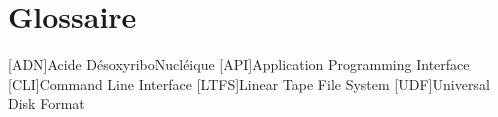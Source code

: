 
\chapter*{Glossaire}
\begin{acronym}
	[ADN]{Acide DésoxyriboNucléique}
	[API]{Application Programming Interface}
	[CLI]{Command Line Interface}
	[LTFS]{Linear Tape File System}
	[UDF]{Universal Disk Format}
\end{acronym}
